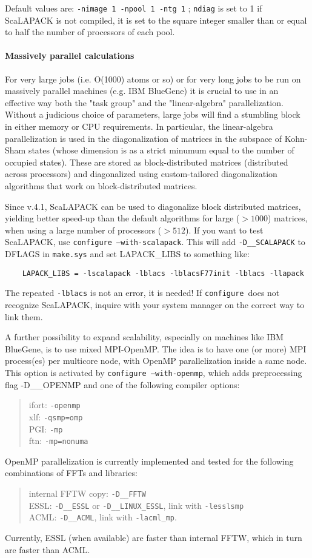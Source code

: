 \documentclass[12pt,a4paper]{article}
\def\configure{\texttt{configure}}
\begin{document}
Default values are: \texttt{-nimage 1 -npool 1 -ntg 1} ; 
\texttt{ndiag} is set to 1 if ScaLAPACK is not compiled,
it is set to the square integer smaller than or equal to  half the number 
of processors of each pool.

\paragraph{Massively parallel calculations}
For very large jobs (i.e. O(1000) atoms or so) or for very long jobs
to be run on massively parallel  machines (e.g. IBM BlueGene) it is
crucial to use in an effective way both the "task group" and the
"linear-algebra" parallelization. Without a judicious choice of
parameters, large jobs will find a stumbling block in either memory or 
CPU requirements. In particular, the linear-algebra parallelization is
used in the diagonalization  of matrices in the subspace of Kohn-Sham
states (whose dimension is as a strict minumum equal to the number of
occupied states). These are stored as block-distributed matrices
(distributed across processors) and diagonalized using custom-tailored
diagonalization algorithms that work on block-distributed matrices.

Since v.4.1, ScaLAPACK can be used to diagonalize block distributed
matrices, yielding better speed-up than the default algorithms for
large ($ > 1000$) matrices, when using a large number of processors 
($> 512$). If you want to test ScaLAPACK,
use \texttt{configure --with-scalapack}. This
will add
\texttt{-D\_\_SCALAPACK} to DFLAGS in \texttt{make.sys} and set LAPACK\_LIBS to something
like:
\begin{verbatim}
    LAPACK_LIBS = -lscalapack -lblacs -lblacsF77init -lblacs -llapack
\end{verbatim}
The repeated \texttt{-lblacs} is not an error, it is needed! If \configure\ does not recognize
ScaLAPACK, inquire with your system manager
on the correct way to link them.

A further possibility to expand scalability, especially on machines
like IBM BlueGene, is to use mixed MPI-OpenMP. The idea is to have
one (or more) MPI process(es) per multicore node, with OpenMP
parallelization inside a same node. This option is activated by  \texttt{configure --with-openmp},
which adds preprocessing flag -D\_\_OPENMP
and one  of the following compiler options:
\begin{quote}
 ifort: \texttt{-openmp}\\
 xlf:   \texttt{-qsmp=omp}\\
 PGI:   \texttt{-mp}\\
 ftn:   \texttt{-mp=nonuma}
\end{quote}
OpenMP parallelization is currently implemented and tested for the following combinations of FFTs
and libraries:
\begin{quote}
 internal FFTW copy: \texttt{-D\_\_FFTW}\\
 ESSL: \texttt{-D\_\_ESSL} or \texttt{-D\_\_LINUX\_ESSL}, link 
 with \texttt{-lesslsmp}\\
 ACML: \texttt{-D\_\_ACML}, link with \texttt{-lacml\_mp}.
\end{quote}
Currently, ESSL (when available) are faster than internal FFTW,
which in turn are faster than ACML.
\end{document}
